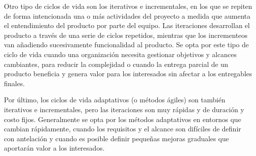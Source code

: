 Otro tipo de ciclos de vida son los iterativos e incrementales, en los que se repiten de forma intencionada una o más actividades del proyecto a medida que aumenta el entendimiento del producto por parte del equipo. Las iteraciones desarrollan el producto a través de una serie de ciclos repetidos, mientras que los incrementeos van añadiendo sucesivamente funcionalidad al producto. Se opta por este tipo de ciclo de vida cuando una organización necesita gestionar objetivos y alcances cambiantes, para reducir la complejidad o cuando la entrega parcial de un producto beneficia y genera valor para los interesados sin afectar a los entregables finales.

Por último, los ciclos de vida adaptativos (o métodos ágiles) son también iterativos e incrementales, pero las iteraciones son muy rápidas y de duración y costo fijos. Generalmente se opta por los métodos adaptativos en entornos que cambian rápidamente, cuando los requisitos y el alcance son difíciles de definir con antelación y cuando es posible definir pequeñas mejoras graduales que aportarán valor a los interesados.